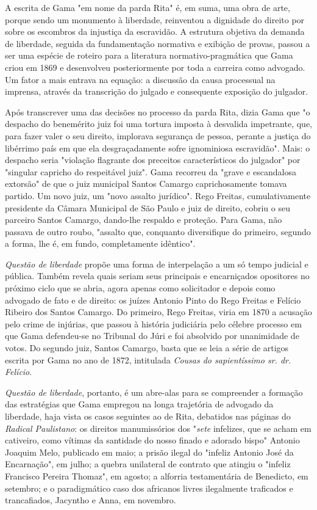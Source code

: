 A escrita de Gama "em nome da parda Rita" é, em suma, uma obra de arte,
porque sendo um monumento à liberdade, reinventou a dignidade do direito
por sobre os escombros da injustiça da escravidão. A estrutura objetiva
da demanda de liberdade, seguida da fundamentação normativa e exibição
de provas, passou a ser uma espécie de roteiro para a literatura
normativo-pragmática que Gama criou em 1869 e desenvolveu posteriormente
por toda a carreira como advogado. Um fator a mais entrava na equação: a
discussão da causa processual na imprensa, através da transcrição do
julgado e consequente exposição do julgador.

Após transcrever uma das decisões no processo da parda Rita, dizia Gama
que "o despacho do benemérito juiz foi uma tortura imposta à desvalida
impetrante, que, para fazer valer o seu direito, implorava segurança de
pessoa, perante a justiça do libérrimo país em que ela desgraçadamente
sofre ignominiosa escravidão". Mais: o despacho seria "violação
flagrante dos preceitos característicos do julgador" por "singular
capricho do respeitável juiz". Gama recorreu da "grave e escandalosa
extorsão" de que o juiz municipal Santos Camargo caprichosamente tomava
partido. Um novo juiz, um "novo assalto jurídico". Rego Freitas,
cumulativamente presidente da Câmara Municipal de São Paulo e juiz de
direito, cobriu o seu parceiro Santos Camargo, dando-lhe respaldo e
proteção. Para Gama, não passava de outro roubo, "assalto que, conquanto
diversifique do primeiro, segundo a forma, lhe é, em fundo,
completamente idêntico".

\emph{Questão de liberdade} propõe uma forma de interpelação a um só
tempo judicial e pública. Também revela quais seriam seus principais e
encarniçados opositores no próximo ciclo que se abria, agora apenas como
solicitador e depois como advogado de fato e de direito: os juízes
Antonio Pinto do Rego Freitas e Felício Ribeiro dos Santos Camargo. Do
primeiro, Rego Freitas, viria em 1870 a acusação pelo crime de injúrias,
que passou à história judiciária pelo célebre processo em que Gama
defendeu-se no Tribunal do Júri e foi absolvido por unanimidade de
votos. Do segundo juiz, Santos Camargo, basta que se leia a série de
artigos escrita por Gama no ano de 1872, intitulada \emph{Cousas do
sapientíssimo sr. dr. Felício}.

\emph{Questão de liberdade}, portanto, é um abre-alas para se
compreender a formação das estratégias que Gama empregou na longa
trajetória de advogado da liberdade, haja vista os casos seguintes ao de
Rita, debatidos nas páginas do \emph{Radical Paulistano}: os direitos
manumissórios dos "\emph{sete} infelizes, que se acham em cativeiro,
como vítimas da santidade do nosso finado e adorado bispo" Antonio
Joaquim Melo, publicado em maio; a prisão ilegal do "infeliz Antonio
José da Encarnação", em julho; a quebra unilateral de contrato que
atingiu o "infeliz Francisco Pereira Thomaz", em agosto; a alforria
testamentária de Benedicto, em setembro; e o paradigmático caso dos
africanos livres ilegalmente traficados e trancafiados, Jacyntho e Anna,
em novembro.

